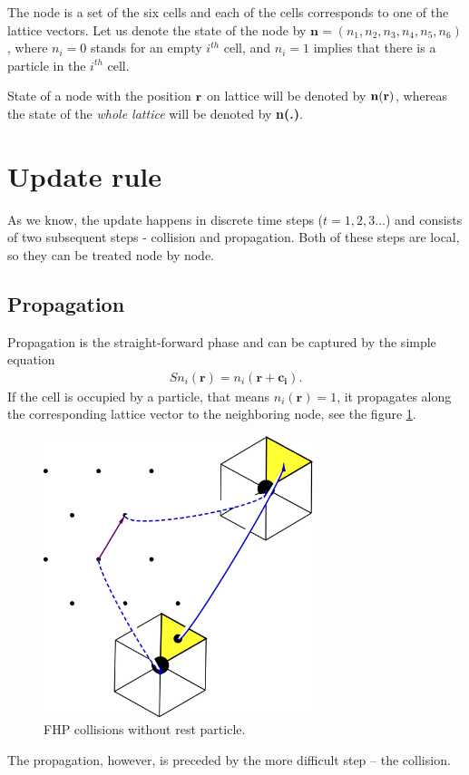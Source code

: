 The node is a set of the six cells and each of the cells corresponds to one of the lattice vectors.
Let us denote the state of the node by $\bm{n} = (n_1,n_2,n_3,n_4,n_5,n_6)$, where $n_i = 0$ stands for an empty $i^{th}$ cell, and $n_i = 1$ implies that there is a particle in the $i^{th}$ cell. 

State of a node with the position $\bf{r}$ on lattice will be denoted by $\bf{n(r)}$, whereas the state of the \textit{whole lattice} will be denoted by \textbf{n(.)}.

\section{Update rule}
As we know, the update happens in discrete time steps ($t=1,2,3...$) and consists of two subsequent steps - collision and propagation. Both of these steps are local, so they can be treated node by node.

\subsection{Propagation}

Propagation is the straight-forward phase and can be captured by the simple equation
\begin{align*}
S n_i(\bm{r}) = n_i(\bm{r} + \bm{c_i}). 
\end{align*}
If the cell is occupied by a particle, that means $n_i(\bm{r})=1$, it propagates along the corresponding lattice vector to the neighboring node, see the figure \ref{FHPprop}.

\begin{figure}[H]
 \centering
 \includegraphics[width=0.7\textwidth]{./img/FHPprop}
 \caption{FHP collisions without rest particle.}
 \label{FHPprop}
\end{figure}
The propagation, however, is preceded by the more difficult step -- the collision.


